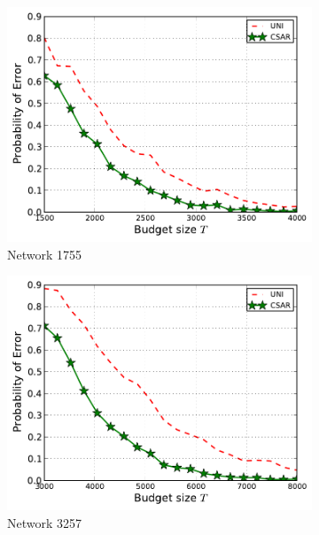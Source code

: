 \documentclass{article}
\begin{document}
\begin{figure}[htbp]
\centering
\begin{subfigure}[c]{\imgsize\textwidth}
	\includegraphics[width=\textwidth]{fig/exp/mst-1755}
	\caption{Network 1755}
\end{subfigure}
\begin{subfigure}[c]{\imgsize\textwidth}
	\includegraphics[width=\textwidth]{fig/exp/mst-3257}
	\caption{Network 3257}
\end{subfigure}
\begin{subfigure}[c]{\imgsize\textwidth}

\end{subfigure}
\end{figure}
\end{document}
